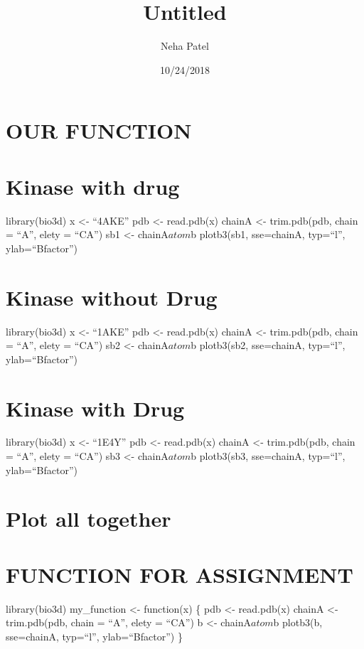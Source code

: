 \documentclass[]{article}
\title{Untitled}
\author{Neha Patel}
\date{10/24/2018}
\begin{document}
\maketitle

\section{OUR FUNCTION}\label{our-function}

\section{Kinase with drug}\label{kinase-with-drug}

library(bio3d) x \textless{}- ``4AKE'' pdb \textless{}- read.pdb(x)
chainA \textless{}- trim.pdb(pdb, chain = ``A'', elety = ``CA'') sb1
\textless{}- chainA\(atom\)b plotb3(sb1, sse=chainA, typ=``l'',
ylab=``Bfactor'')

\section{Kinase without Drug}\label{kinase-without-drug}

library(bio3d) x \textless{}- ``1AKE'' pdb \textless{}- read.pdb(x)
chainA \textless{}- trim.pdb(pdb, chain = ``A'', elety = ``CA'') sb2
\textless{}- chainA\(atom\)b plotb3(sb2, sse=chainA, typ=``l'',
ylab=``Bfactor'')

\section{Kinase with Drug}\label{kinase-with-drug-1}

library(bio3d) x \textless{}- ``1E4Y'' pdb \textless{}- read.pdb(x)
chainA \textless{}- trim.pdb(pdb, chain = ``A'', elety = ``CA'') sb3
\textless{}- chainA\(atom\)b plotb3(sb3, sse=chainA, typ=``l'',
ylab=``Bfactor'')

\section{Plot all together}\label{plot-all-together}

\section{FUNCTION FOR ASSIGNMENT}\label{function-for-assignment}

library(bio3d) my\_function \textless{}- function(x) \{ pdb \textless{}-
read.pdb(x) chainA \textless{}- trim.pdb(pdb, chain = ``A'', elety =
``CA'') b \textless{}- chainA\(atom\)b plotb3(b, sse=chainA, typ=``l'',
ylab=``Bfactor'') \}
\end{document}
